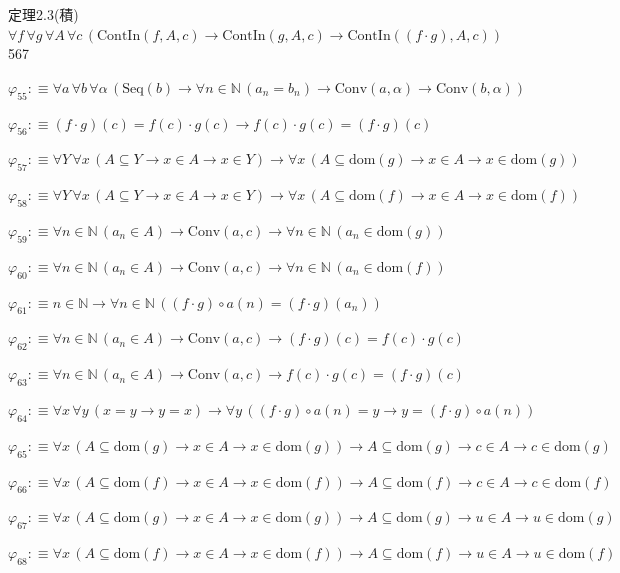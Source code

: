\begin{fullproof}{定理2.3(積)}{$\forall f\,\forall g\,\forall A\,\forall c\,(\mathrm{ContIn}(f,A,c) \to \mathrm{ContIn}(g,A,c) \to \mathrm{ContIn}((f \cdot g),A,c))$}{567}
\begin{abbrevlist}
\item $\varphi_{55} :\equiv \forall a\,\forall b\,\forall \alpha\,(\mathrm{Seq}(b) \to \forall n \in \mathbb{N}\,(a_{n} = b_{n}) \to \mathrm{Conv}(a,\alpha) \to \mathrm{Conv}(b,\alpha))$
\item $\varphi_{56} :\equiv (f \cdot g)(c) = f(c) \cdot g(c) \to f(c) \cdot g(c) = (f \cdot g)(c)$
\item $\varphi_{57} :\equiv \forall Y\,\forall x\,(A \subseteq Y \to x \in A \to x \in Y) \to \forall x\,(A \subseteq \mathrm{dom}(g) \to x \in A \to x \in \mathrm{dom}(g))$
\item $\varphi_{58} :\equiv \forall Y\,\forall x\,(A \subseteq Y \to x \in A \to x \in Y) \to \forall x\,(A \subseteq \mathrm{dom}(f) \to x \in A \to x \in \mathrm{dom}(f))$
\item $\varphi_{59} :\equiv \forall n \in \mathbb{N}\,(a_{n} \in A) \to \mathrm{Conv}(a,c) \to \forall n \in \mathbb{N}\,(a_{n} \in \mathrm{dom}(g))$
\item $\varphi_{60} :\equiv \forall n \in \mathbb{N}\,(a_{n} \in A) \to \mathrm{Conv}(a,c) \to \forall n \in \mathbb{N}\,(a_{n} \in \mathrm{dom}(f))$
\item $\varphi_{61} :\equiv n \in \mathbb{N} \to \forall n \in \mathbb{N}\,((f \cdot g) \circ a(n) = (f \cdot g)(a_{n}))$
\item $\varphi_{62} :\equiv \forall n \in \mathbb{N}\,(a_{n} \in A) \to \mathrm{Conv}(a,c) \to (f \cdot g)(c) = f(c) \cdot g(c)$
\item $\varphi_{63} :\equiv \forall n \in \mathbb{N}\,(a_{n} \in A) \to \mathrm{Conv}(a,c) \to f(c) \cdot g(c) = (f \cdot g)(c)$
\item $\varphi_{64} :\equiv \forall x\,\forall y\,(x = y \to y = x) \to \forall y\,((f \cdot g) \circ a(n) = y \to y = (f \cdot g) \circ a(n))$
\item $\varphi_{65} :\equiv \forall x\,(A \subseteq \mathrm{dom}(g) \to x \in A \to x \in \mathrm{dom}(g)) \to A \subseteq \mathrm{dom}(g) \to c \in A \to c \in \mathrm{dom}(g)$
\item $\varphi_{66} :\equiv \forall x\,(A \subseteq \mathrm{dom}(f) \to x \in A \to x \in \mathrm{dom}(f)) \to A \subseteq \mathrm{dom}(f) \to c \in A \to c \in \mathrm{dom}(f)$
\item $\varphi_{67} :\equiv \forall x\,(A \subseteq \mathrm{dom}(g) \to x \in A \to x \in \mathrm{dom}(g)) \to A \subseteq \mathrm{dom}(g) \to u \in A \to u \in \mathrm{dom}(g)$
\item $\varphi_{68} :\equiv \forall x\,(A \subseteq \mathrm{dom}(f) \to x \in A \to x \in \mathrm{dom}(f)) \to A \subseteq \mathrm{dom}(f) \to u \in A \to u \in \mathrm{dom}(f)$

\end{abbrevlist}
\end{fullproof}
